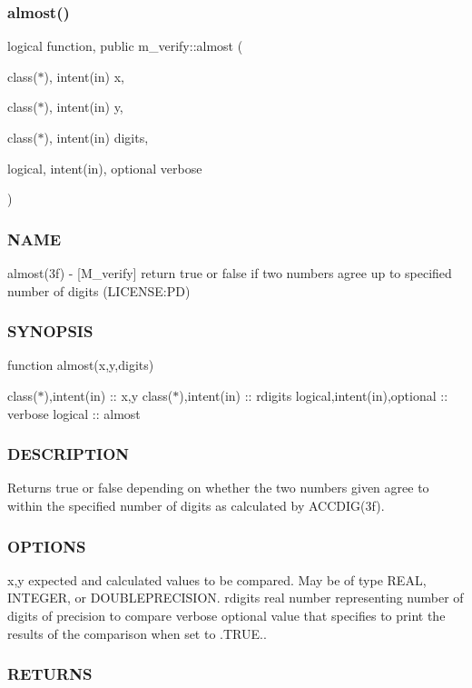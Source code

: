 \subsubsection{\texorpdfstring{almost()}{almost()}}
{\footnotesize\ttfamily logical function, public m\+\_\+verify\+::almost (\begin{DoxyParamCaption}\item[{class($\ast$), intent(in)}]{x,  }\item[{class($\ast$), intent(in)}]{y,  }\item[{class($\ast$), intent(in)}]{digits,  }\item[{logical, intent(in), optional}]{verbose }\end{DoxyParamCaption})}



\subsubsection*{N\+A\+ME}

almost(3f) -\/ \mbox{[}M\+\_\+verify\mbox{]} return true or false if two numbers agree up to specified number of digits (L\+I\+C\+E\+N\+SE\+:PD) \subsubsection*{S\+Y\+N\+O\+P\+S\+IS}

function almost(x,y,digits)

class($\ast$),intent(in) \+:\+: x,y class($\ast$),intent(in) \+:\+: rdigits logical,intent(in),optional \+:\+: verbose logical \+:\+: almost

\subsubsection*{D\+E\+S\+C\+R\+I\+P\+T\+I\+ON}

Returns true or false depending on whether the two numbers given agree to within the specified number of digits as calculated by A\+C\+C\+D\+I\+G(3f). \subsubsection*{O\+P\+T\+I\+O\+NS}

x,y expected and calculated values to be compared. May be of type R\+E\+AL, I\+N\+T\+E\+G\+ER, or D\+O\+U\+B\+L\+E\+P\+R\+E\+C\+I\+S\+I\+ON. rdigits real number representing number of digits of precision to compare verbose optional value that specifies to print the results of the comparison when set to .T\+R\+UE.. \subsubsection*{R\+E\+T\+U\+R\+NS}

